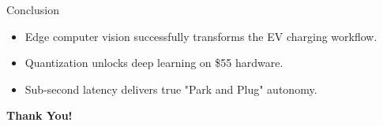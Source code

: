 \documentclass{beamer}
\begin{document}
\begin{frame}{Conclusion}
\begin{itemize}
    \item Edge computer vision successfully transforms the EV charging workflow.
    \item Quantization unlocks deep learning on \$55 hardware.
    \item Sub-second latency delivers true "Park and Plug" autonomy.
\end{itemize}
\vspace{0.5cm}
\begin{center}
    \Large \textbf{Thank You!}
\end{center}
\end{frame}
\end{document}
